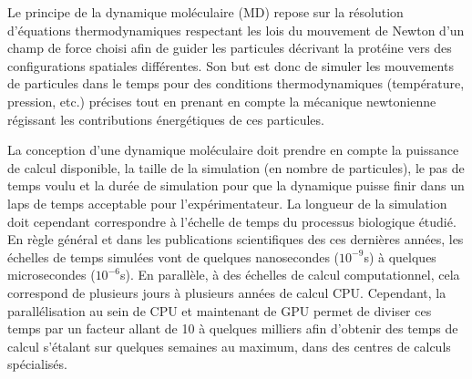 
Le principe de la dynamique moléculaire (MD) repose sur la résolution d'équations thermodynamiques respectant les lois du mouvement de Newton d'un champ de force choisi afin de guider les particules décrivant la protéine vers des configurations spatiales différentes. Son but est donc de simuler les mouvements de particules dans le temps pour des conditions thermodynamiques (température, pression, etc.) précises tout en prenant en compte la mécanique newtonienne régissant les contributions énergétiques de ces particules.

La conception d'une dynamique moléculaire doit prendre en compte la puissance de calcul disponible, la taille de la simulation (en nombre de particules), le pas de temps voulu et la durée de simulation pour que la dynamique puisse finir dans un laps de temps acceptable pour l'expérimentateur. La longueur de la simulation doit cependant correspondre à l'échelle de temps du processus biologique étudié. En règle général et dans les publications scientifiques des ces dernières années, les échelles de temps simulées vont de quelques nanosecondes ($10^{-9}$s) à quelques microsecondes ($10^{-6}$s). En parallèle, à des échelles de calcul computationnel, cela correspond de plusieurs jours à plusieurs années de calcul CPU. Cependant, la parallélisation au sein de CPU et maintenant de GPU permet de diviser ces temps par un facteur allant de 10 à quelques milliers afin d'obtenir des temps de calcul s'étalant sur quelques semaines au maximum, dans des centres de calculs spécialisés.


